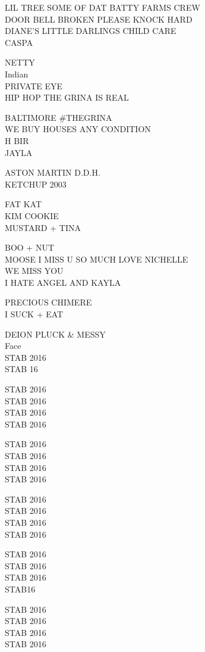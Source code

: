 \documentclass[10pt,letterpaper]{article}
\begin{document}
LIL TREE SOME OF DAT BATTY FARMS CREW\\
DOOR BELL BROKEN PLEASE KNOCK HARD\\
DIANE'S LITTLE DARLINGS CHILD CARE\\
CASPA

NETTY\\
Indian\\
PRIVATE EYE\\
HIP HOP THE GRINA IS REAL

BALTIMORE \#THEGRINA\\
WE BUY HOUSES ANY CONDITION\\
H BIR\\
JAYLA

ASTON MARTIN D.D.H.\\
KETCHUP 2003

FAT KAT\\
KIM COOKIE\\
MUSTARD + TINA

BOO + NUT\\
MOOSE I MISS U SO MUCH LOVE NICHELLE\\
WE MISS YOU\\
I HATE ANGEL AND KAYLA

PRECIOUS CHIMERE\\
I SUCK + EAT

DEION PLUCK \& MESSY\\
Face\\
STAB 2016\\
STAB 16

STAB 2016\\
STAB 2016\\
STAB 2016\\
STAB 2016

STAB 2016\\
STAB 2016\\
STAB 2016\\
STAB 2016

STAB 2016\\
STAB 2016\\
STAB 2016\\
STAB 2016

STAB 2016\\
STAB 2016\\
STAB 2016\\
STAB16

STAB 2016\\
STAB 2016\\
STAB 2016\\
STAB 2016
\end{document}
